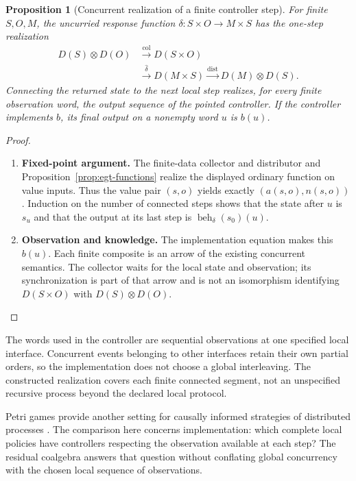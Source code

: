 \documentclass[11pt,a4paper]{article}
\numberwithin{equation}{section}
\newtheorem{proposition}[theorem]{Proposition}
\theoremstyle{definition}
\theoremstyle{remark}
\theoremstyle{plain}
\begin{document}
\begin{proposition}[Concurrent realization of a finite controller step]
\label{prop:egt-controller-realization}
For finite $S,O,M$, the uncurried response function
$\delta:S\times O\to M\times S$ has the one-step realization
\[
 \begin{aligned}
 D(S)\otimes D(O)
 &\xrightarrow{\operatorname{col}}D(S\times O)\\
 &\xrightarrow{\widehat\delta}D(M\times S)
 \xrightarrow{\operatorname{dist}}D(M)\otimes D(S).
 \end{aligned}
\]
Connecting the returned state to the next local step realizes,
for every finite observation word, the output sequence of the
pointed controller. If the controller implements $b$, its final
output on a nonempty word $u$ is $b(u)$.
\end{proposition}
\begin{proof}
\leavevmode
\begin{enumerate}[label=\textup{(\arabic*)},leftmargin=*,itemsep=4pt,topsep=3pt]
  \item \textbf{Fixed-point argument.} The finite-data collector and distributor and
Proposition~\ref{prop:egt-functions} realize the displayed ordinary
function on value inputs. Thus the value pair $(s,o)$ yields
exactly $(a(s,o),n(s,o))$. Induction on the number of connected
steps shows that the state after $u$ is $s_u$ and that the output
at its last step is
$\operatorname{beh}_\delta(s_0)(u)$.
  \item \textbf{Observation and knowledge.} The implementation equation makes this $b(u)$. Each finite composite is an arrow of the existing concurrent
semantics. The collector waits for the local state and observation;
its synchronization is part of that arrow and is not an
isomorphism identifying $D(S\times O)$ with
$D(S)\otimes D(O)$.
\end{enumerate}
\end{proof}

The words used in the controller are sequential observations at
one specified local interface. Concurrent events belonging to other
interfaces retain their own partial orders, so the implementation
does not choose a global interleaving. The constructed realization
covers each finite connected segment, not an unspecified recursive
process beyond the declared local protocol.

Petri games provide another setting for causally informed
strategies of distributed processes
\citep{FinkbeinerOlderog2017PetriGames}. The comparison here concerns
implementation: which complete local policies have controllers
respecting the observation available at each step? The residual
coalgebra answers that question without conflating global concurrency
with the chosen local sequence of observations.
\end{document}
